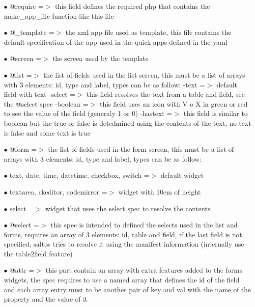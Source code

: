 \documentclass[a4paper]{article}
\begin{document}
\begin{compactitem}
\item[\color{myblue}$\bullet$] @require   =$>$ this field defines the required php that contains the make\_app\_file
              function like this file
\item[\color{myblue}$\bullet$] @\_template =$>$ the xml app file used as template, this file contains the default
              specification of the app used in the quick apps defined in the yaml
\item[\color{myblue}$\bullet$] @screen    =$>$ the screen used by the template
\item[\color{myblue}$\bullet$] @list      =$>$ the list of fields used in the list screen, this must be a list of
              arrays with 3 elements: id, type and label, types can be as follow:
              -text    =$>$ default field with text
              -select  =$>$ this field resolves the text from a table and field, see
                          the @select spec
              -boolean =$>$ this field uses an icon with V o X in green or red to
                          see the value of the field (generaly 1 or 0)
              -hastext =$>$ this field is similar to boolean but the true or false
                          is detedmined using the contents of the text, no text is
                          false and some text is true
\item[\color{myblue}$\bullet$] @form      =$>$ the list of fields used in the form screen, this must be a list of
              arrays with 3 elements: id, type and label, types can be as follow:
              \begin{compactitem}
              \item[\color{myblue}$\bullet$] text, date, time, datetime, checkbox, switch =$>$ default widget
              \item[\color{myblue}$\bullet$] textarea, ckeditor, codemirror =$>$ widget with 10em of height
              \item[\color{myblue}$\bullet$] select =$>$ widget that uses the select spec to resolve the contents
              \end{compactitem}
\item[\color{myblue}$\bullet$] @select    =$>$ this spec is intended to defined the selects used in the list and
              forms, requires an array of 3 elements: id, table and field, if the
              last field is not specified, saltos tries to resolve it using the
              manifest information (internally use the table2field feature)
\item[\color{myblue}$\bullet$] @attr      =$>$ this part contain an array with extra features added to the forms
              widgets, the spec requires to use a named array that defines the
              id of the field and each array entry must to be another pair of
              key and val with the name of the property and the value of it
\end{compactitem}
\end{document}
